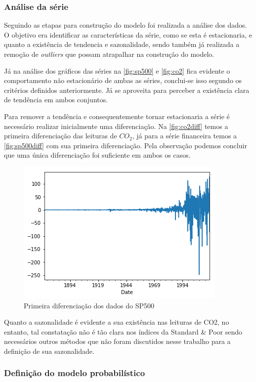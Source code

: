 \documentclass[
    12pt,
    oneside,
    a4paper,
    english,
    brazil
]{abntex2}
\begin{document}
\subsubsection{Análise da série}

Seguindo as etapas para construção do modelo foi realizada a análise dos dados.
O  objetivo  era identificar  as  características  da  série,  como se  esta  é
estacionaria, e quanto  a existência de tendencia e  sazonalidade, sendo também
já realizada a remoção de \textit{outliers} que possam atrapalhar na construção
do modelo.

Já   na   análise   dos   gráficos  das   séries   na   \autoref{fig:sp500}   e
\autoref{fig:co2} fica  evidente o comportamento  não estacionário de  ambas as
séries, conclui-se  isso segundo  os critérios  definidos anteriormente.  Já se
aproveita para perceber a existência clara de tendência em ambos conjuntos.

Para  remover a  tendência e  consequentemente  tornar estacionaria  a série  é
necessário  realizar inicialmente  uma diferenciação.  Na \autoref{fig:co2diff}
temos  a  primeira diferenciação  das  leituras  de  $CO_2$,  já para  a  série
financeira temos a \autoref{fig:sp500diff} com sua primeira diferenciação. Pela
observação podemos concluir que uma única diferenciação foi suficiente em ambos
os casos.

\begin{figure}[ht]
    \centering
    \caption{Primeira diferenciação dos dados do SP500}\label{fig:sp500diff}
    \includegraphics[width=.5\linewidth]{images/sp500diff.png}
\end{figure}

Quanto  a sazonalidade  é evidente  a sua  existência nas  leituras de  CO2, no
entanto, tal constatação não é tão clara  nos índices da Standard \& Poor sendo
necessários  outros métodos  que não  foram  discutidos nesse  trabalho para  a
definição de sua sazonalidade.

\subsubsection{Definição do modelo probabilístico}
\end{document}
